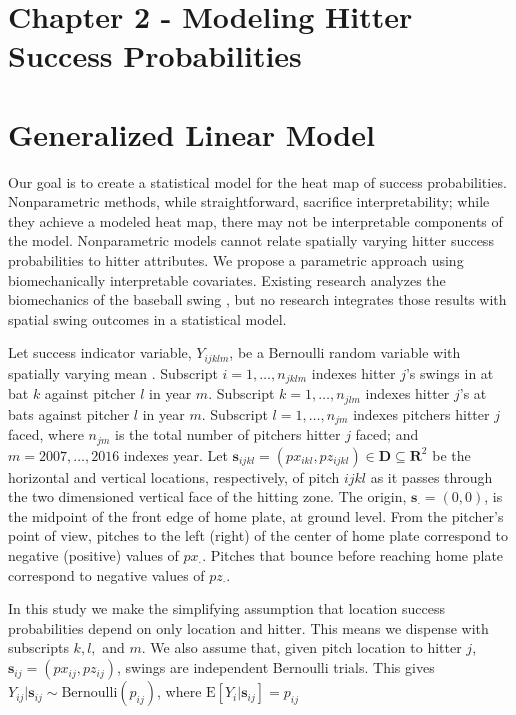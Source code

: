 \documentclass{article}
\begin{document}
\section*{Chapter 2 - Modeling Hitter Success Probabilities} 


\section{Generalized Linear Model}

Our goal is to create a statistical model for the heat map of success probabilities. Nonparametric methods, while straightforward, sacrifice interpretability; while they achieve a modeled heat map, there may not be interpretable components of the model. Nonparametric models cannot relate spatially varying hitter success probabilities to hitter attributes. We propose a parametric approach using biomechanically interpretable covariates. Existing research analyzes the biomechanics of the baseball swing \citep{Welch1995}, but no research integrates those results with spatial swing outcomes in a statistical model.


Let success indicator variable, $Y_{ijklm}$, be a Bernoulli random variable with spatially varying mean \citep{Ross2002}. Subscript $i = 1, \dots, n_{jklm}$ indexes hitter $j$'s swings in at bat $k$ against pitcher $l$ in year $m$. Subscript $k = 1, \dots, n_{jlm}$ indexes hitter $j$'s at bats against pitcher $l$ in year $m$. Subscript $l = 1, \dots, n_{jm}$ indexes pitchers hitter $j$ faced, where $n_{jm}$ is the total number of pitchers hitter $j$ faced; and $m = 2007, \dots, 2016$ indexes year. Let $\pmb{s}_{ijkl} = (px_{ikl}, pz_{ijkl})\in \pmb{D} \subseteq \pmb{R}^{2}$ be the horizontal and vertical locations, respectively, of pitch $ijkl$ as it passes through the two dimensioned vertical face of the hitting zone. The origin, $\pmb{s}_{\cdot} = (0,0)$, is the midpoint of the front edge of home plate, at ground level. From the pitcher's point of view, pitches to the left (right) of the center of home plate correspond to negative (positive) values of $px_{\cdot}$. Pitches that bounce before reaching home plate correspond to negative values of $pz_{\cdot}$.  

In this study we make the simplifying assumption that location success probabilities depend on only location and hitter. This means we dispense with subscripts $k, l,$ and $m$. We also assume that, given pitch location to hitter $j$, $\pmb{s}_{ij} = (px_{ij}, pz_{ij})$,  swings are independent Bernoulli trials. This gives $Y_{ij}|\pmb{s}_{ij} \sim \text{Bernoulli}(p_{ij})$, where $\text{E}[Y_{i}|\pmb{s}_{ij}] = p_{ij}$
\end{document}
